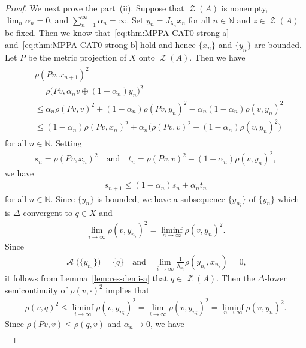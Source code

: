 \documentclass[draft]{amsart}
\numberwithin{equation}{section}
\def\N{\mathbb N}
\DeclareMathOperator{\AC}{\mathcal{A}}
\DeclareMathOperator{\Zer}{\mathcal{Z}}
\theoremstyle{plain}
\theoremstyle{definition}
\theoremstyle{remark}
\begin{document}
\begin{proof}
 We next prove the part~(ii). Suppose that $\Zer(A)$ is nonempty, 
 $\lim_{n}\alpha_n =0$, and $\sum_{n=1}^{\infty}\alpha_n =\infty$. 
 Set $y_n=J_{\lambda_n} x_n$ for all $n\in \N$ and $z\in \Zer(A)$ be fixed. 
 Then we know that~\eqref{eq:thm:MPPA-CAT0-strong-a} and~\eqref{eq:thm:MPPA-CAT0-strong-b} hold 
 and hence $\{x_n\}$ and $\{y_n\}$ are bounded. 
 Let $P$ be the metric projection of $X$ onto $\Zer(A)$. Then we have 
 \begin{align}
  \begin{split}\label{eq:thm:MPPA-CAT0-strong-e}
   &\rho(Pv, x_{n+1})^2 \\
   &=\rho\bigl(Pv, \alpha_n v \oplus (1-\alpha_n) y_n\bigr)^2 \\
   &\leq \alpha_n \rho(Pv, v)^2 + (1-\alpha_n)\rho(Pv, y_n)^2 
 -\alpha_n(1-\alpha_n)\rho(v, y_n)^2 \\
   &\leq (1-\alpha_n)\rho(Pv, x_n)^2 + \alpha_n \bigl(\rho(Pv, v)^2 
 -(1-\alpha_n)\rho(v, y_n)^2 \bigr)
  \end{split}
 \end{align}
 for all $n\in \N$. Setting 
 \begin{align*}
  s_n=\rho(Pv, x_n)^2 \quad \textrm{and} \quad t_n = \rho(Pv, v)^2 -(1-\alpha_n)\rho(v, y_n)^2, 
 \end{align*}
 we have 
 \begin{align}\label{eq:thm:MPPA-CAT0-strong-f}
  s_{n+1} \leq (1-\alpha_n) s_n + \alpha_n t_n
 \end{align}
 for all $n\in \N$. Since $\{y_n\}$ is bounded, we have a subsequence $\{y_{n_i}\}$ 
 of $\{y_n\}$ which is $\Delta$-convergent to $q\in X$ and 
 \begin{align*}
  \lim_{i\to \infty} \rho(v, y_{n_i})^2 = \liminf_{n\to \infty} \rho(v, y_{n})^2. 
 \end{align*}
 Since 
 \begin{align*}
  \AC\bigl(\{y_{n_i}\}\bigr)=\{q\} \quad \textrm{and} \quad 
  \lim_{i\to \infty} \frac{1}{\lambda_{n_i}}\rho(y_{n_i}, x_{n_i})=0, 
 \end{align*}
 it follows from Lemma~\ref{lem:res-demi-a} that $q\in \Zer(A)$. 
 Then the $\Delta$-lower semicontinuity of $\rho(v, \cdot)^2$ implies that 
 \begin{align*}
  \rho(v, q)^2 
  \leq \liminf_{i\to \infty}\rho(v, y_{n_i})^2 
  =\lim_{i\to \infty}\rho(v, y_{n_i})^2 
  =\liminf_{n\to \infty} \rho(v, y_{n})^2. 
 \end{align*}
 Since $\rho(Pv, v)\leq \rho(q, v)$ and $\alpha_n\to 0$, we have 
 \begin{align*}

\end{align*}
\end{proof}
\end{document}
